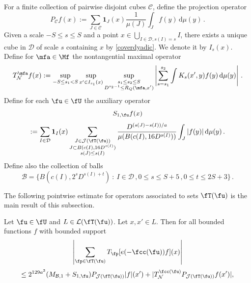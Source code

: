 For a finite collection of pairwise disjoint cubes $\mathcal{C}$, define the projection operator
$$
    P_{\mathcal{C}}f(x) :=\sum_{J\in\mathcal{C}}\mathbf{1}_J(x) \frac{1}{\mu(J)}\int_J f(y) \, \mathrm{d}\mu(y)\,.
$$
Given a scale $-S \le s\le S$ and a point $x \in \bigcup_{I\in \mathcal{D}, s(I) = s} I$, there exists a unique cube in $\mathcal{D}$ of scale $s$ containing $x$ by \eqref{coverdyadic}. We denote it by $I_s(x)$. Define for $\mfa \in \Mf$ the nontangential maximal operator
\begin{equation}
    \label{eq-TN-def}
    T_{\mathcal{N}}^\mfa f(x) := \sup_{-S \le s_1 < S} \sup_{x' \in I_{s_1}(x)} \sup_{\substack{s_1 \le s_2 \le S\\ D^{s_2-1} \le R_Q(\mfa, x')}} \left| \sum_{s = s_1}^{s_2} \int K_s(x',y) f(y) \, \mathrm{d}\mu(y) \right|\,.
\end{equation}
Define for each $\fu \in \fU$ the auxiliary operator
$$
    S_{1,\fu}f(x)
$$
\begin{equation}
    \label{eq-def-S-op}
    :=\sum_{I\in\mathcal{D}} \mathbf{1}_{I}(x) \sum_{\substack{J\in \mathcal{J}(\fT(\fu))\\
    J\subset B(c(I), 16 D^{s(I)})\\ s(J) \le s(I)}} \frac{D^{(s(J) - s(I))/a}}{\mu(B(c(I), 16D^{s(I)}))}\int_J |f(y)| \, \mathrm{d}\mu(y)\,.
\end{equation}
Define also the collection of balls
$$
    \mathcal{B} = \{B(c(I), 2^s D^{s(I)+t}) \ : \ I \in \mathcal{D}\,, 0 \le s \le S + 5\,, 0 \le t \le 2S+3\}\,.
$$

The following pointwise estimate for operators associated to sets $\fT(\fu)$ is the main result of this subsection.

\begin{lemma}
    \label{pointwise-tree-estimate}
    \leanok
    Let $\fu \in \fU$ and $L \in \mathcal{L}(\fT(\fu))$. Let $x, x' \in L$.
    Then for all bounded functions $f$ with bounded support
    $$
        \left|\sum_{\fp \in \fT(\fu)} T_{\fp}[ e(-\fcc(\fu))f](x)\right|
    $$
    \begin{equation}
        \label{eq-LJ-ptwise}
        \leq 2^{129a^3}(M_{\mathcal{B},1}+S_{1,\fu})P_{\mathcal{J}(\fT(\fu))}|f|(x')+|T_{\mathcal{N}}^{\fcc(\fu)} P_{\mathcal{J}(\fT(\fu))}f(x')|,
    \end{equation}
\end{lemma}

